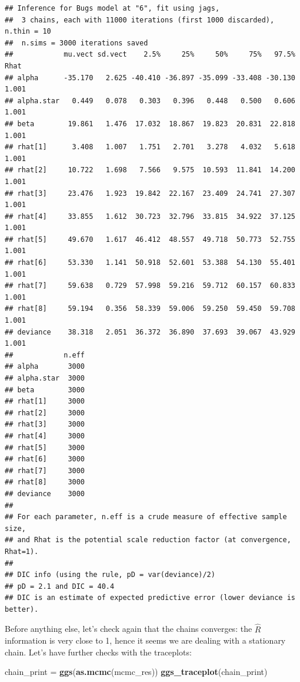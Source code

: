 \documentclass[]{article}
\newenvironment{Shaded}{\begin{snugshade}}{\end{snugshade}}
\newcommand{\KeywordTok}[1]{\textcolor[rgb]{0.13,0.29,0.53}{\textbf{#1}}}
\newcommand{\NormalTok}[1]{#1}
\newcommand{\StringTok}[1]{\textcolor[rgb]{0.31,0.60,0.02}{#1}}
\begin{document}
\begin{verbatim}
## Inference for Bugs model at "6", fit using jags,
##  3 chains, each with 11000 iterations (first 1000 discarded), n.thin = 10
##  n.sims = 3000 iterations saved
##            mu.vect sd.vect    2.5%     25%     50%     75%   97.5%  Rhat
## alpha      -35.170   2.625 -40.410 -36.897 -35.099 -33.408 -30.130 1.001
## alpha.star   0.449   0.078   0.303   0.396   0.448   0.500   0.606 1.001
## beta        19.861   1.476  17.032  18.867  19.823  20.831  22.818 1.001
## rhat[1]      3.408   1.007   1.751   2.701   3.278   4.032   5.618 1.001
## rhat[2]     10.722   1.698   7.566   9.575  10.593  11.841  14.200 1.001
## rhat[3]     23.476   1.923  19.842  22.167  23.409  24.741  27.307 1.001
## rhat[4]     33.855   1.612  30.723  32.796  33.815  34.922  37.125 1.001
## rhat[5]     49.670   1.617  46.412  48.557  49.718  50.773  52.755 1.001
## rhat[6]     53.330   1.141  50.918  52.601  53.388  54.130  55.401 1.001
## rhat[7]     59.638   0.729  57.998  59.216  59.712  60.157  60.833 1.001
## rhat[8]     59.194   0.356  58.339  59.006  59.250  59.450  59.708 1.001
## deviance    38.318   2.051  36.372  36.890  37.693  39.067  43.929 1.001
##            n.eff
## alpha       3000
## alpha.star  3000
## beta        3000
## rhat[1]     3000
## rhat[2]     3000
## rhat[3]     3000
## rhat[4]     3000
## rhat[5]     3000
## rhat[6]     3000
## rhat[7]     3000
## rhat[8]     3000
## deviance    3000
## 
## For each parameter, n.eff is a crude measure of effective sample size,
## and Rhat is the potential scale reduction factor (at convergence, Rhat=1).
## 
## DIC info (using the rule, pD = var(deviance)/2)
## pD = 2.1 and DIC = 40.4
## DIC is an estimate of expected predictive error (lower deviance is better).
\end{verbatim}

Before anything else, let's check again that the chains converges: the
\(\hat{R}\) information is very close to 1, hence it seems we are
dealing with a stationary chain. Let's have further checks with the
traceplots:

\begin{Shaded}
\begin{Highlighting}[]
\NormalTok{chain_print =}\StringTok{ }\KeywordTok{ggs}\NormalTok{(}\KeywordTok{as.mcmc}\NormalTok{(mcmc_res))}
\KeywordTok{ggs_traceplot}\NormalTok{(chain_print)}
\end{Highlighting}
\end{Shaded}
\end{document}
